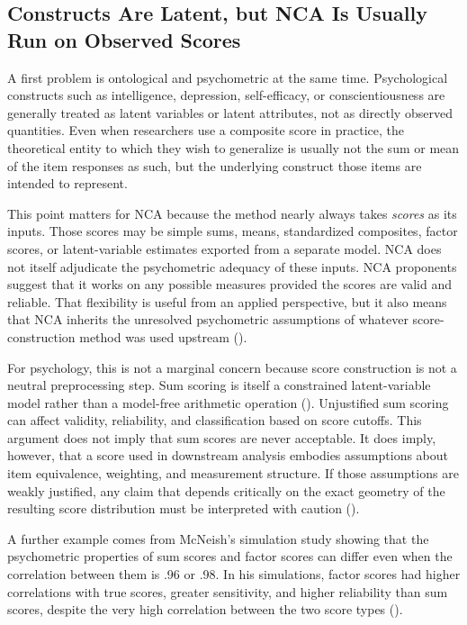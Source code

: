\documentclass[
  man,
  longtable,
  nolmodern,
  notxfonts,
  notimes,
  colorlinks=true,linkcolor=blue,citecolor=blue,urlcolor=blue]{apa7}
\begin{document}
\subsection{Constructs Are Latent, but NCA Is Usually Run on Observed
Scores}\label{constructs-are-latent-but-nca-is-usually-run-on-observed-scores}

A first problem is ontological and psychometric at the same time.
Psychological constructs such as intelligence, depression,
self-efficacy, or conscientiousness are generally treated as latent
variables or latent attributes, not as directly observed quantities.
Even when researchers use a composite score in practice, the theoretical
entity to which they wish to generalize is usually not the sum or mean
of the item responses as such, but the underlying construct those items
are intended to represent.

This point matters for NCA because the method nearly always takes
\emph{scores} as its inputs. Those scores may be simple sums, means,
standardized composites, factor scores, or latent-variable estimates
exported from a separate model. NCA does not itself adjudicate the
psychometric adequacy of these inputs. NCA proponents suggest that it
works on any possible measures provided the scores are valid and
reliable. That flexibility is useful from an applied perspective, but it
also means that NCA inherits the unresolved psychometric assumptions of
whatever score-construction method was used upstream
().

For psychology, this is not a marginal concern because score
construction is not a neutral preprocessing step. Sum scoring is itself
a constrained latent-variable model rather than a model-free arithmetic
operation (). Unjustified sum scoring can affect validity, reliability, and
classification based on score cutoffs. This argument does not imply that
sum scores are never acceptable. It does imply, however, that a score
used in downstream analysis embodies assumptions about item equivalence,
weighting, and measurement structure. If those assumptions are weakly
justified, any claim that depends critically on the exact geometry of
the resulting score distribution must be interpreted with caution
().

A further example comes from McNeish's simulation study showing that the
psychometric properties of sum scores and factor scores can differ even
when the correlation between them is .96 or .98. In his simulations,
factor scores had higher correlations with true scores, greater
sensitivity, and higher reliability than sum scores, despite the very
high correlation between the two score types
().
\end{document}
